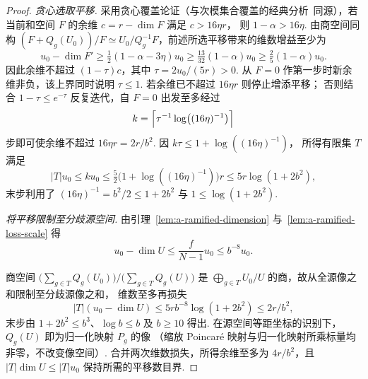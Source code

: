 \begin{proof}
\emph{贪心选取平移.}
采用贪心覆盖论证（与次模集合覆盖的经典分析~\cite{Wolsey1982}同源），若当前和空间 $F$ 的余维 $c=r-\dim F$ 满足 $c>16\eta r$，
则 $1-\alpha>16\eta$. 由商空间同构
$(F+Q_g(U_0))/F\simeq U_0/Q_g^{-1}F$，前述所选平移带来的维数增益至少为
\[
 u_0-\dim F'\ge \tfrac12(1-\alpha-3\eta)u_0
 \ge \tfrac{13}{32}(1-\alpha)u_0
 \ge \tfrac25(1-\alpha)u_0.
\]
因此余维不超过 $(1-\tau)c$，其中 $\tau=2u_0/(5r)>0$.
从 $F=0$ 作第一步时新余维非负，该上界同时说明 $\tau\le1$.
若余维已不超过 $16\eta r$ 则停止增添平移；
否则结合 $1-\tau\le e^{-\tau}$ 反复迭代，自 $F=0$ 出发至多经过
\[
 k=\Bigl\lceil\tau^{-1}\log\bigl((16\eta)^{-1}\bigr)\Bigr\rceil
\]
步即可使余维不超过 $16\eta r=2r/b^2$. 因 $k\tau\le1+\log((16\eta)^{-1})$，
所得有限集 $T$ 满足
\[
 |T|u_0\le ku_0
 \le \tfrac52\bigl(1+\log((16\eta)^{-1})\bigr)r
 \le 5r\log(1+2b^2),
\]
末步利用了 $(16\eta)^{-1}=b^2/2\le1+2b^2$ 与 $1\le\log(1+2b^2)$.

\emph{将平移限制至分歧源空间.}
由引理~\ref{lem:a-ramified-dimension} 与~\ref{lem:a-ramified-loss-scale} 得
\[
 u_0-\dim U\le \frac{f}{N-1}u_0\le b^{-8}u_0.
\]

商空间 $\bigl(\sum_{g\in T}Q_g(U_0)\bigr)\big/\bigl(\sum_{g\in T}Q_g(U)\bigr)$ 是
$\bigoplus_{g\in T}U_0/U$ 的商，故从全源像之和限制至分歧源像之和，
维数至多再损失
\[
 |T|(u_0-\dim U)
 \le 5r b^{-8}\log(1+2b^2)
 \le 2r/b^2 ,
\]
末步由 $1+2b^2\le b^3$、$\log b\le b$ 及 $b\ge10$ 得出.
在源空间等距坐标的识别下，$Q_g(U)$ 即为归一化映射 $P_g$ 的像
（缩放 Poincaré 映射与归一化映射所乘标量均非零，不改变像空间）.
合并两次维数损失，所得余维至多为 $4r/b^2$，且 $|T|\dim U\le |T|u_0$ 保持所需的平移数目界.
\end{proof}
